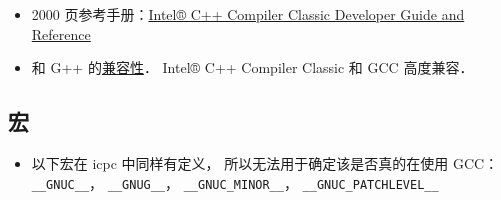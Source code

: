 
\begin{issues}
\issueDraft
\end{issues}

\begin{itemize}
\item 2000 页参考手册：\href{https://www.intel.com/content/www/us/en/develop/documentation/cpp-compiler-developer-guide-and-reference/top.html}{Intel® C++ Compiler Classic Developer Guide and Reference}
\item 和 G++ 的\href{https://www.intel.com/content/www/us/en/develop/documentation/cpp-compiler-developer-guide-and-reference/top/compatibility-and-portability/gcc-compatibility-and-interoperability.html}{兼容性}． Intel® C++ Compiler Classic 和 GCC 高度兼容．
\end{itemize}

\subsection{宏}
\begin{itemize}
\item 以下宏在 icpc 中同样有定义， 所以无法用于确定该是否真的在使用 GCC： \verb|__GNUC__|， \verb|__GNUG__|， \verb|__GNUC_MINOR__|， \verb|__GNUC_PATCHLEVEL__|
\end{itemize}

